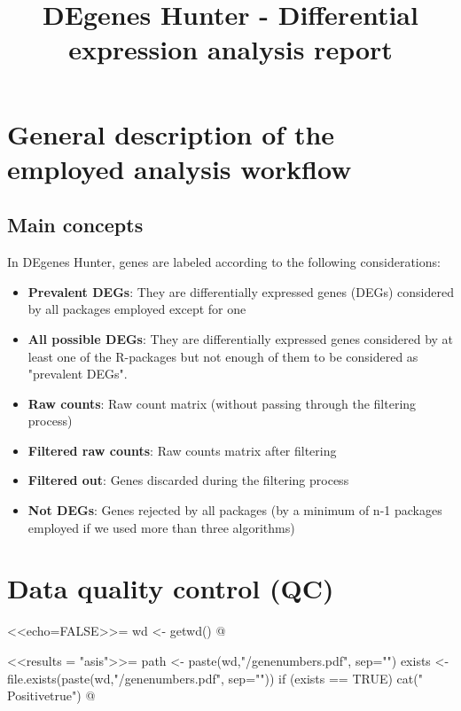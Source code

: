 \documentclass{article}
\begin{document}
\title{DEgenes Hunter - Differential expression analysis report}
	\maketitle


\section{General description of the employed analysis workflow}



\subsection{Main concepts}

In DEgenes Hunter, genes are labeled according to the following considerations:
\begin{itemize}
       \item {\bf Prevalent DEGs}: They are differentially expressed genes (DEGs) considered by all packages employed except for one
       \item {\bf All possible DEGs}: They are differentially expressed genes considered by at least one of the R-packages but not enough of them to be considered as "prevalent DEGs".
       \item {\bf Raw counts}: Raw count matrix (without passing through the filtering process) 
       \item {\bf Filtered raw counts}: Raw counts matrix after filtering
       \item {\bf Filtered out}: Genes discarded during the filtering process
       \item {\bf Not DEGs}: Genes rejected by all packages (by a minimum of n-1 packages employed if we used more than three algorithms)
\end{itemize}


\section{Data quality control (QC)}


<<echo=FALSE>>=
wd <- getwd()
@


\newif\ifPositive

<<results = "asis">>=
path <- paste(wd,"/genenumbers.pdf", sep="")
exists <- file.exists(paste(wd,"/genenumbers.pdf", sep=""))
if (exists == TRUE) {
  cat("\\Positivetrue")
}
@
\end{document}
